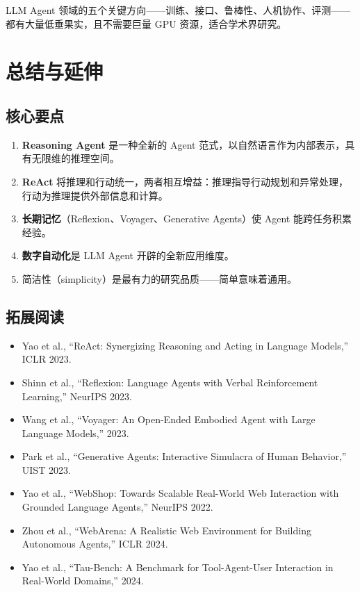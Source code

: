 \documentclass[a4paper]{article}
\begin{document}
LLM Agent 领域的五个关键方向——训练、接口、鲁棒性、人机协作、评测——都有大量低垂果实，且不需要巨量 GPU 资源，适合学术界研究。

\section{总结与延伸}

\subsection{核心要点}

\begin{enumerate}
    \item \textbf{Reasoning Agent} 是一种全新的 Agent 范式，以自然语言作为内部表示，具有无限维的推理空间。
    \item \textbf{ReAct} 将推理和行动统一，两者相互增益：推理指导行动规划和异常处理，行动为推理提供外部信息和计算。
    \item \textbf{长期记忆}（Reflexion、Voyager、Generative Agents）使 Agent 能跨任务积累经验。
    \item \textbf{数字自动化}是 LLM Agent 开辟的全新应用维度。
    \item 简洁性（simplicity）是最有力的研究品质——简单意味着通用。
\end{enumerate}

\subsection{拓展阅读}

\begin{itemize}
    \item Yao et al., ``ReAct: Synergizing Reasoning and Acting in Language Models,'' ICLR 2023.
    \item Shinn et al., ``Reflexion: Language Agents with Verbal Reinforcement Learning,'' NeurIPS 2023.
    \item Wang et al., ``Voyager: An Open-Ended Embodied Agent with Large Language Models,'' 2023.
    \item Park et al., ``Generative Agents: Interactive Simulacra of Human Behavior,'' UIST 2023.
    \item Yao et al., ``WebShop: Towards Scalable Real-World Web Interaction with Grounded Language Agents,'' NeurIPS 2022.
    \item Zhou et al., ``WebArena: A Realistic Web Environment for Building Autonomous Agents,'' ICLR 2024.
    \item Yao et al., ``Tau-Bench: A Benchmark for Tool-Agent-User Interaction in Real-World Domains,'' 2024.
\end{itemize}

\end{document}
